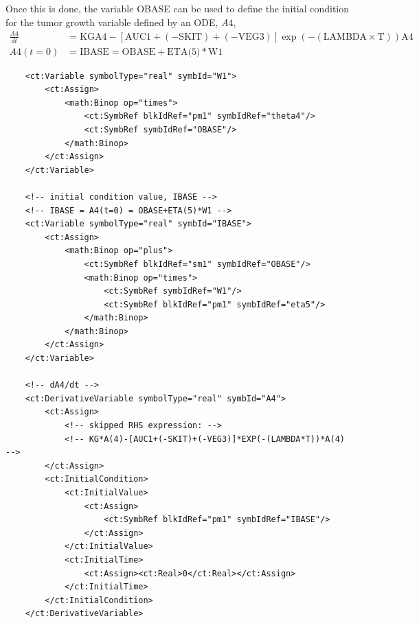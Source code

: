 Once this is done, the variable OBASE can be used to define the 
initial condition for the tumor growth variable defined by an ODE, $A4$,
\begin{align}
\frac{A4}{dt} &= \mbox{KG} \mbox{A4}-[\mbox{AUC1}+(-\mbox{SKIT})+(-\mbox{VEG3})] \exp(-(\mbox{LAMBDA}\times \mbox{T}))\mbox{A4} \nonumber \\
A4(t=0)	& = \mbox{IBASE} = \mbox{OBASE}+\mbox{ETA(5)}*\mbox{W1} \nonumber %
\end{align}


\lstset{language=XML}
\begin{lstlisting}
    <ct:Variable symbolType="real" symbId="W1">
        <ct:Assign>
            <math:Binop op="times">
                <ct:SymbRef blkIdRef="pm1" symbIdRef="theta4"/>
                <ct:SymbRef symbIdRef="OBASE"/>
            </math:Binop>
        </ct:Assign>
    </ct:Variable>
    
    <!-- initial condition value, IBASE -->
    <!-- IBASE = A4(t=0) = OBASE+ETA(5)*W1 -->
    <ct:Variable symbolType="real" symbId="IBASE">
        <ct:Assign>
            <math:Binop op="plus">
                <ct:SymbRef blkIdRef="sm1" symbIdRef="OBASE"/>
                <math:Binop op="times">
                    <ct:SymbRef symbIdRef="W1"/>
                    <ct:SymbRef blkIdRef="pm1" symbIdRef="eta5"/>
                </math:Binop>
            </math:Binop>
        </ct:Assign>
    </ct:Variable>
    
    <!-- dA4/dt -->
    <ct:DerivativeVariable symbolType="real" symbId="A4">
        <ct:Assign>
            <!-- skipped RHS expression: -->
            <!-- KG*A(4)-[AUC1+(-SKIT)+(-VEG3)]*EXP(-(LAMBDA*T))*A(4) -->
        </ct:Assign>
        <ct:InitialCondition>
            <ct:InitialValue>
                <ct:Assign>
                    <ct:SymbRef blkIdRef="pm1" symbIdRef="IBASE"/>
                </ct:Assign>
            </ct:InitialValue>
            <ct:InitialTime>
                <ct:Assign><ct:Real>0</ct:Real></ct:Assign>
            </ct:InitialTime>
        </ct:InitialCondition>
    </ct:DerivativeVariable>
\end{lstlisting}


